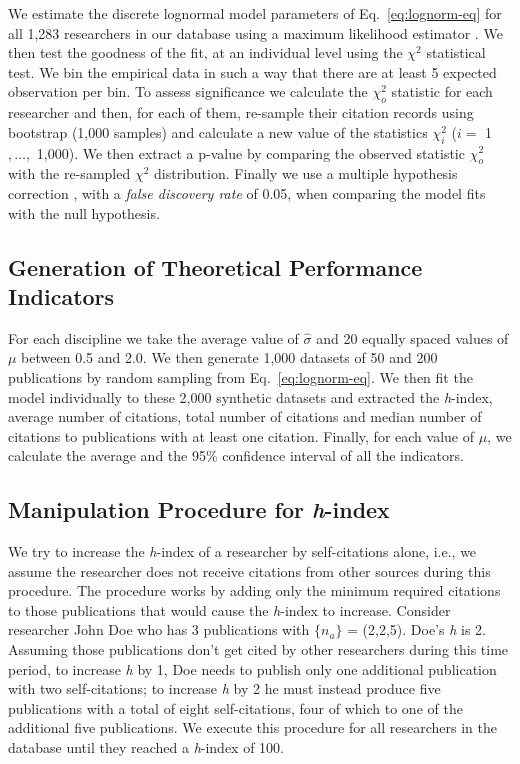 We estimate the discrete lognormal model parameters of Eq.~\eqref{eq:lognorm-eq} for all 1,283 researchers in our database using a maximum likelihood estimator \cite{Stringer2010}. We then test the goodness of the fit, at an individual level using the $\chi^2$ statistical test. We bin the empirical data in such a way that there are at least 5 expected observation per bin. To assess significance we calculate the $\chi^2_o$ statistic for each researcher and then, for each of them, re-sample their citation records using bootstrap (1,000 samples) and calculate a new value of the statistics $\chi^2_i$ ($i = $ 1 $, \dotsc,$ 1,000). We then extract a p-value by comparing the observed statistic $\chi^2_o$ with the re-sampled $\chi^2$ distribution. Finally we use a multiple hypothesis correction \cite{Benjamini1995}, with a \emph{false discovery rate} of 0.05, when comparing the model fits with the null hypothesis.


\subsection{Generation of Theoretical Performance Indicators}

For each discipline we take the average value of $\hat{\sigma}$ and 20 equally spaced values of $\mu$ between 0.5 and 2.0. We then generate 1,000 datasets of 50 and 200 publications by random sampling from Eq.~\eqref{eq:lognorm-eq}. We then fit the model individually to these 2,000 synthetic datasets and extracted the \emph{h}-index, average number of citations, total number of citations and median number of citations to publications with at least one citation. Finally, for each value of $\mu$, we calculate the average and the 95\% confidence interval of all the indicators.


\subsection{Manipulation Procedure for \emph{h}-index}

We try to increase the \emph{h}-index of a researcher by self-citations alone, i.e., we assume the researcher does not receive citations from other sources during this procedure. The procedure works by adding only the minimum required citations to those publications that would cause the \emph{h}-index to increase. Consider researcher John Doe who has 3 publications with $\{n_a\}$ = (2,2,5). Doe's \emph{h} is 2. Assuming those publications don't get cited by other researchers during this time period, to increase \emph{h} by 1, Doe needs to publish only one additional publication with two self-citations; to increase \emph{h} by 2 he must instead produce five publications with a total of eight self-citations, four of which to one of the additional five publications. We execute this procedure for all researchers in the database until they reached a \emph{h}-index of 100.


